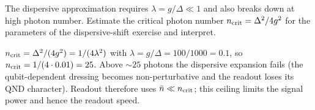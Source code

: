 \begin{exercise}
The dispersive approximation requires $\lambda=g/\Delta\ll1$ and
also breaks down at high photon number. Estimate the critical
photon number $n_{\rm crit}=\Delta^2/4g^2$ for the parameters of the
dispersive-shift exercise and interpret.
\begin{solution}
$n_{\rm crit}=\Delta^2/(4g^2)=1/(4\lambda^2)$ with
$\lambda=g/\Delta=100/1000=0.1$, so $n_{\rm crit}=1/(4\cdot0.01)=25$.
Above $\sim25$ photons the dispersive expansion fails (the
qubit-dependent dressing becomes non-perturbative and the readout
loses its QND character). Readout therefore uses $\bar n\ll n_{\rm crit}$;
this ceiling limits the signal power and hence the readout speed.
\end{solution}
\end{exercise}
